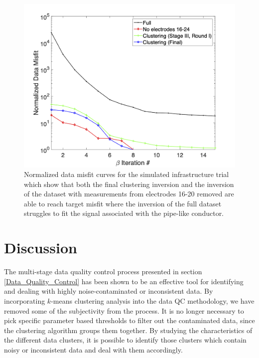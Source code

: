 \documentclass[final,authoryear,5p,times,twocolumn]{elsarticle}
\begin{document}
\begin{figure} [!ht]
	\begin{center}
	\includegraphics[trim=1.3cm 0.2cm 2.6cm 1.2cm, clip=true,width=0.75\linewidth]{./Figures/Fig26.png}
	\end{center}
\caption{Normalized data misfit curves for the simulated infrastructure trial which show that both the final clustering inversion and the inversion of the dataset with measurements from electrodes 16-20 removed are able to reach target misfit where the inversion of the full dataset struggles to fit the signal associated with the pipe-like conductor.}
\label{fig:Synth_Horseshoe_UniInfrastructure_MisfitPlots}
\end{figure}


\section{Discussion}
\label{Discussion}
The multi-stage data quality control process presented in section \ref{Data_Quality_Control} has been shown to be an effective tool for identifying and dealing with highly noise-contaminated or inconsistent data. By incorporating $k$-means clustering analysis into the data QC methodology, we have removed some of the subjectivity from the process. It is no longer necessary to pick specific parameter based thresholds to filter out the contaminated data, since the clustering algorithm groups them together. By studying the characteristics of the different data clusters, it is possible to identify those clusters which contain noisy or inconsistent data and deal with them accordingly.
\end{document}
